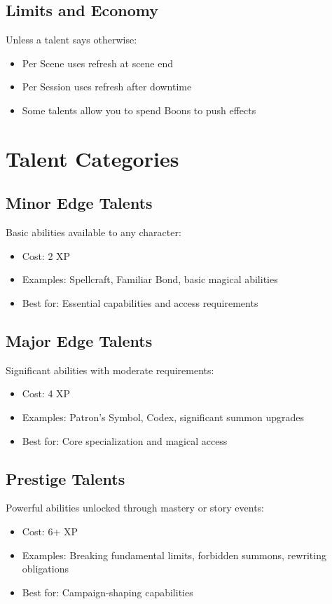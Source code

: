 \documentclass[11pt,twoside,openany]{book}
\begin{document}
\subsection*{Limits and Economy}

Unless a talent says otherwise:
\begin{itemize}
\item Per Scene uses refresh at scene end
\item Per Session uses refresh after downtime
\item Some talents allow you to spend Boons to push effects
\end{itemize}

\section*{Talent Categories} 

\subsection*{Minor Edge Talents}

Basic abilities available to any character:
\begin{itemize}
\item Cost: 2 XP
\item Examples: Spellcraft, Familiar Bond, basic magical abilities
\item Best for: Essential capabilities and access requirements
\end{itemize}

\subsection*{Major Edge Talents}

Significant abilities with moderate requirements:
\begin{itemize}
\item Cost: 4 XP
\item Examples: Patron's Symbol, Codex, significant summon upgrades
\item Best for: Core specialization and magical access
\end{itemize}

\subsection*{Prestige Talents}

Powerful abilities unlocked through mastery or story events:
\begin{itemize}
\item Cost: 6+ XP
\item Examples: Breaking fundamental limits, forbidden summons, rewriting obligations
\item Best for: Campaign-shaping capabilities
\end{itemize}
\end{document}
